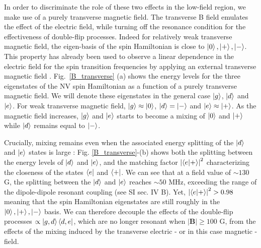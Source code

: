 \documentclass[preprintnumbers,amsmath,amssymb,superscriptaddress,twocolumn,showpacs]{revtex4-2}
\begin{document}
In order to discriminate the role of these two effects in the low-field region, we make use of a purely transverse magnetic field. The transverse B field emulates the effect of the electric field, while turning off the resonance condition for the effectiveness of double-flip processes. Indeed for relatively weak transverse magnetic field, the eigen-basis of the spin Hamiltonian is close to $\ket{0},\ket{+},\ket{-}$. This property has already been used to observe a linear dependence in the electric field for the spin transition frequencies by applying an external transverse magnetic field \cite{dolde2011electric,qiu2022nanoscale}.
Fig.~\ref{B_transverse} (a) shows the energy levels for the three eigenstates of the NV spin Hamiltonian as a function of a purely transverse magnetic field. We will denote these eigenstates in the general case $\ket{g}$, $\ket{d}$ and $\ket{e}$. For weak transverse magnetic field, $\ket{g} \approx \ket{0}$, $\ket{d}=\ket{-}$ and $\ket{e} \approx \ket{+}$. As the magnetic field increases, $\ket{g}$ and $\ket{e}$ starts to become a mixing of $\ket{0}$ and $\ket{+}$ while $\ket{d}$ remains equal to $\ket{-}$.

Crucially, mixing remains even when the associated energy splitting of the $\ket{d}$ and $\ket{e}$ states is large : Fig. \ref{B_transverse}-(b) shows both the splitting between the energy levels of $\ket{d}$ and $\ket{e}$, and the matching factor $\abs{\bra{e}\ket{+}}^2$ characterizing the closeness of the states $\bra{e}$ and $\bra{+}$. We can see that at a field value of $\sim 130$ G, the splitting between the $\ket{d}$ and $\ket{e}$ reaches $\sim 50$ MHz, exceeding the range of the dipole-dipole resonant coupling (see SI sec. IV B). Yet, $\abs{\bra{e}\ket{+}}^2 > 0.98$ meaning that the spin Hamiltonian eigenstates are still roughly in the $\ket{0}, \ket{+}, \ket{-}$ basis. We can therefore decouple the effects of the double-flip processes  $\propto \ket{g,d}\bra{d,e}$, which are no longer resonant when $| \bm B | \geq 100$ G, from the effects of the mixing induced by the transverse electric - or in this case magnetic - field.
\end{document}
